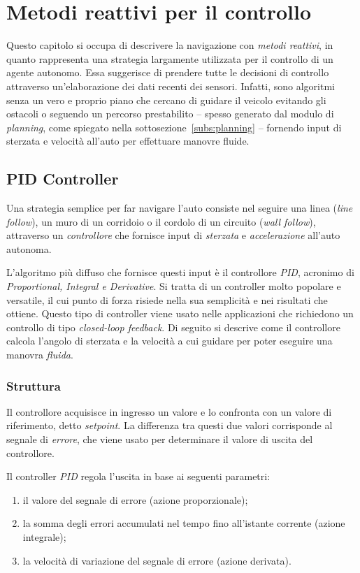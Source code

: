 \chapter{Metodi reattivi per il controllo}
\label{chap:chap2}

Questo capitolo si occupa di descrivere la navigazione con 
\textit{metodi reattivi}, in quanto rappresenta una strategia largamente 
utilizzata per il controllo di un agente autonomo. 
Essa suggerisce di prendere tutte le decisioni di controllo attraverso
un'elaborazione dei dati recenti dei sensori. 
Infatti, sono algoritmi senza un vero e proprio piano che cercano di guidare il veicolo 
evitando gli ostacoli o seguendo un percorso prestabilito -- spesso generato 
dal modulo di \textit{planning}, come spiegato nella sottosezione~\ref{subs:planning} --
fornendo input di sterzata e velocità all’auto per effettuare manovre fluide.

\section{PID Controller}
Una strategia semplice per far navigare l'auto consiste nel seguire una linea 
(\textit{line follow}), un muro di un corridoio o il cordolo di un circuito (\textit{wall follow}), 
attraverso un \textit{controllore} che fornisce input di \textit{sterzata} e 
\textit{accelerazione} all'auto autonoma. 

L'algoritmo più diffuso che fornisce questi input è il controllore \textit{PID},
acronimo di \textit{Proportional, Integral e Derivative}.
Si tratta di un controller molto popolare e versatile, il cui punto di forza risiede nella
sua semplicità e nei risultati che ottiene. Questo tipo di controller viene usato
nelle applicazioni che richiedono un controllo di tipo \textit{closed-loop feedback}.
Di seguito si descrive come il controllore calcola l'angolo di sterzata e la velocità
a cui guidare per poter eseguire una manovra \textit{fluida}.
\subsection{Struttura}
Il controllore acquisisce in ingresso un valore e lo confronta con un valore di 
riferimento, detto \textit{setpoint}. La differenza tra questi due valori corrisponde 
al segnale di \textit{errore}, che viene usato per determinare il valore di uscita del controllore.

Il controller \textit{PID} regola l’uscita in base ai seguenti parametri:
\begin{enumerate}
    \item il valore del segnale di errore (azione proporzionale);
    \item la somma degli errori accumulati nel tempo fino all'istante corrente (azione integrale);
    \item la velocità di variazione del segnale di errore (azione derivata).
\end{enumerate}

